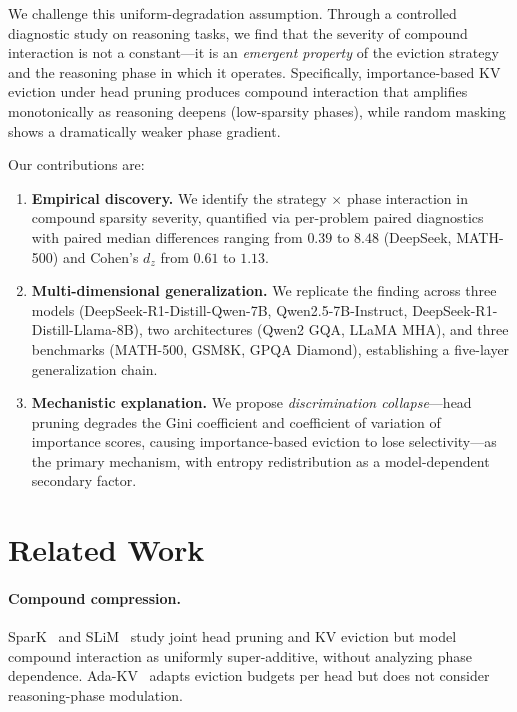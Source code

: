 \documentclass[11pt,a4paper]{article}
\begin{document}
We challenge this uniform-degradation assumption.
Through a controlled diagnostic study on reasoning tasks, we find that the severity of compound interaction is not a constant---it is an \emph{emergent property} of the eviction strategy and the reasoning phase in which it operates.
Specifically, importance-based KV eviction under head pruning produces compound interaction that amplifies monotonically as reasoning deepens (low-sparsity phases), while random masking shows a dramatically weaker phase gradient.

Our contributions are:
\begin{enumerate}
\item \textbf{Empirical discovery.} We identify the strategy $\times$ phase interaction in compound sparsity severity, quantified via per-problem paired diagnostics with paired median differences ranging from $0.39$ to $8.48$ (DeepSeek, MATH-500) and Cohen's $d_z$ from $0.61$ to $1.13$.
\item \textbf{Multi-dimensional generalization.} We replicate the finding across three models (DeepSeek-R1-Distill-Qwen-7B, Qwen2.5-7B-Instruct, DeepSeek-R1-Distill-Llama-8B), two architectures (Qwen2 GQA, LLaMA MHA), and three benchmarks (MATH-500, GSM8K, GPQA Diamond), establishing a five-layer generalization chain.
\item \textbf{Mechanistic explanation.} We propose \emph{discrimination collapse}---head pruning degrades the Gini coefficient and coefficient of variation of importance scores, causing importance-based eviction to lose selectivity---as the primary mechanism, with entropy redistribution as a model-dependent secondary factor.
\end{enumerate}

\section{Related Work}
\label{sec:related}

\paragraph{Compound compression.}
SparK~\citep{spark2024} and SLiM~\citep{slim2024} study joint head pruning and KV eviction but model compound interaction as uniformly super-additive, without analyzing phase dependence.
Ada-KV~\citep{adakv2024} adapts eviction budgets per head but does not consider reasoning-phase modulation.
\end{document}
